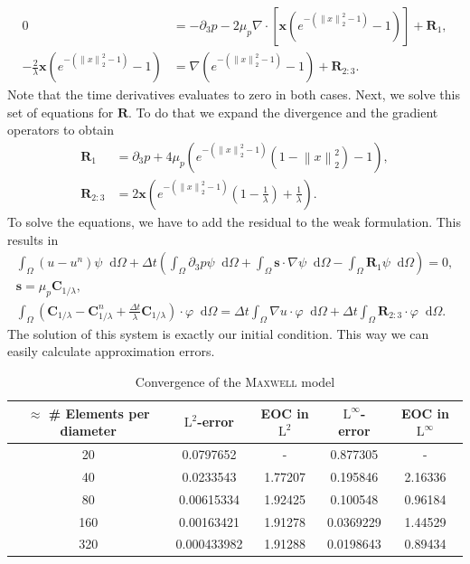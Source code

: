 \documentclass[12pt,a4paper,twoside, open=right]{scrreprt}
\theoremstyle{definition}
\theoremstyle{plain}
\newcommand{\norm}[1]{\left\lVert#1\right\rVert}
\newcommand{\bfs}{\bm{s}}
\newcommand{\bfC}{\bm{C}}
\newcommand{\bfx}{\bm{x}}
\newcommand{\bfR}{\bm{R}}
\newcommand{\D}{\mathop{}\!\mathrm{d}}
\begin{document}
\begin{align}
0 &= -\partial_3 p-2\mu_p \nabla\cdot [\bfx(e^{-(\norm{x}_2^2 -1)}-1)] +\bfR_1,\\
-\frac{2}{\lambda}\bfx(e^{-(\norm{x}_2^2 -1)}-1)&= \nabla (e^{-(\norm{x}_2^2 -1)}-1) +\bfR_{2:3}.
\end{align}
Note that the time derivatives evaluates to zero in both cases. Next, we solve this set of equations for $\bfR$. To do that we expand the divergence and the gradient operators to obtain
\begin{align}
\bfR_1 &= \partial_3 p +4\mu_p(e^{-(\norm{x}_2^2 -1)}(1-\norm{x}_2^2)-1),\\
\bfR_{2:3} &=2\bfx\left(e^{-(\norm{x}_2^2 -1)}\left(1-\frac{1}{\lambda}\right)+\frac{1}{\lambda}\right).
\end{align}
To solve the equations, we have to add the residual to the weak formulation. This results in 
\begin{align}
\int_\Omega(u-u^n)\psi\D\Omega +\Delta t\left(\int_\Omega\partial_3 p\psi\D\Omega + \int_\Omega\bfs\cdot\nabla\psi\D\Omega-\int_\Omega \bfR_1\psi\D\Omega\right) = 0,\\
\bfs =\mu_p\bfC_{1/\lambda},\\
\int_\Omega(\bfC_{1/\lambda} - \bfC_{1/\lambda}^n +\frac{\Delta t}{\lambda}\bfC_{1/\lambda})\cdot\varphi\D\Omega = 
\Delta t\int_\Omega \nabla u\cdot\varphi\D\Omega+\Delta t\int_{\Omega}\bfR_{2:3}\cdot\varphi\D\Omega.
\end{align}
The solution of this system is exactly our initial condition. This way we can easily calculate approximation errors. 
\begin{table}
    \centering
    \begin{tabular}{c|c|c|c|c}
        $\approx$ \# Elements per diameter& $\mathrm{L}^2$-error&EOC in $\mathrm{L}^2$&$\mathrm{L}^\infty$-error &EOC in $\mathrm{L}^\infty$\\
        \hline
        20 & 0.0797652 & - & 0.877305 & -\\
        40 & 0.0233543 & 1.77207 & 0.195846 & 2.16336\\
        80 & 0.00615334 & 1.92425 & 0.100548 & 0.96184\\
        160 & 0.00163421 & 1.91278 & 0.0369229 & 1.44529\\
        320 & 0.000433982 & 1.91288 & 0.0198643 & 0.89434
    \end{tabular}
    \caption{Convergence of the \textsc{Maxwell} model}
    \label{tab:maxwellconv}
\end{table}
\end{document}
